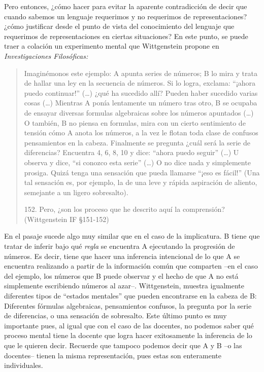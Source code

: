 \documentclass[]{book}
\begin{document}
\begin{refsection}
Pero entonces, ¿cómo hacer para evitar la aparente contradicción de
decir que cuando sabemos un lenguaje requerimos y no requerimos de
representaciones? ¿cómo justificar desde el punto de vista del
conocimiento del lenguaje que requerimos de representaciones en ciertas
situaciones? En este punto, se puede traer a colación un experimento
mental que Wittgenstein propone en \emph{Investigaciones Filosóficas: }

\begin{quote}
Imaginémonos este ejemplo: A apunta series de números; B lo mira y trata
de hallar una ley en la secuencia de números. Si lo logra, exclama:
``¡ahora puedo continuar!'' (\ldots{}) ¿qué ha sucedido allí? Pueden
haber sucedido varias cosas (\ldots{}) Mientras A ponía lentamente un
número tras otro, B se ocupaba de ensayar diversas formulas algebraicas
sobre los números apuntados (\ldots{}) O también, B no piensa en
formulas, mira con un cierto sentimiento de tensión cómo A anota los
números, a la vez le flotan toda clase de confusos pensamientos en la
cabeza. Finalmente se pregunta ¿cuál será la serie de diferencias?
Encuentra 4, 6, 8, 10 y dice: ``ahora puedo seguir'' (\ldots{}) U
observa y dice, ``si conozco esta serie'' (\ldots{}) O no dice nada y
simplemente prosiga. Quizá tenga una sensación que pueda llamarse ``¡eso
es fácil!'' (Una tal sensación es, por ejemplo, la de una leve y rápida
aspiración de aliento, semejante a un ligero sobresalto).

152. Pero, ¿son los proceso que he descrito aquí la comprensión?
(Wittgenstein IF §151-152)
\end{quote}

En el pasaje sucede algo muy similar que en el caso de la implicatura. B
tiene que tratar de inferir bajo qué \emph{regla} se encuentra A
ejecutando la progresión de números. Es decir, tiene que hacer una
inferencia intencional de lo que A se encuentra realizando a partir de
la información común que comparten --en el caso del ejemplo, los números
que B puede observar y el hecho de que A no está simplemente escribiendo
números al azar--. Wittgenstein, muestra igualmente diferentes tipos de
``estados mentales'' que pueden encontrarse en la cabeza de B:
Diferentes fórmulas algebraicas, pensamientos confusos, la pregunta por
la serie de diferencias, o una sensación de sobresalto. Este último
punto es muy importante pues, al igual que con el caso de las docentes,
no podemos saber qué proceso mental tiene la docente que logra hacer
exitosamente la inferencia de lo que le quieren decir. Recuerde que
tampoco podemos decir que A y B --o las docentes-- tienen la misma
representación, pues estas son enteramente individuales.


\end{refsection}
\end{document}
